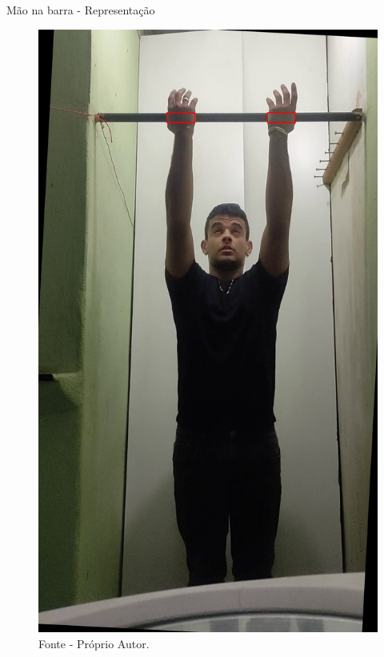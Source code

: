 \begin{frame}{Mão na barra - Representação}
    \begin{figure}[!ht]
    \centering
    \includegraphics[scale=0.1]{img/desenvolvimento/maoBarra/contornos.png}
    \caption*{Fonte - Próprio Autor.}
    \end{figure}
\end{frame}





